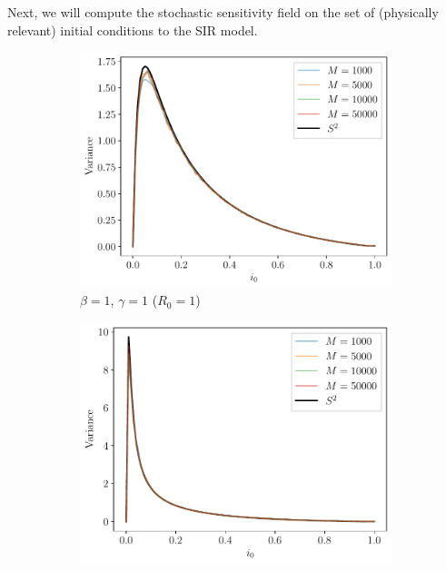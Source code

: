 Next, we will compute the stochastic sensitivity field on the set of (physically relevant) initial conditions to the SIR model.



\begin{figure}
	\begin{center}
		\begin{subfigure}{0.49\textwidth}
			\includegraphics[width=\textwidth]{chp06_applications/figures/sir/sir_s2_1.0_1.0.pdf}
			\caption{\(\beta = 1\), \(\gamma = 1\) (\(R_0 = 1\))}
		\end{subfigure}
		\begin{subfigure}{0.49\textwidth}
			\includegraphics[width=\textwidth]{chp06_applications/figures/sir/sir_s2_1.5_1.0.pdf}

\end{subfigure}
\end{center}
\end{figure}
